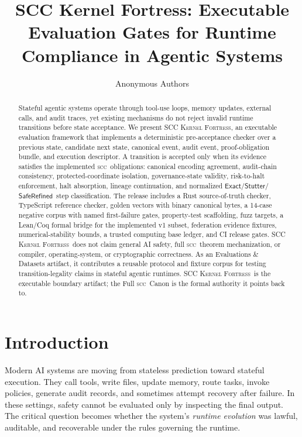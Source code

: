 \documentclass{article}
\title{SCC Kernel Fortress: Executable Evaluation Gates for Runtime Compliance in Agentic Systems}
\author{Anonymous Authors}
\newcommand{\SCC}{\textsc{scc}}
\newcommand{\KF}{\textsc{SCC Kernel Fortress}}
\newcommand{\Exact}{\ensuremath{\mathsf{Exact}}}
\newcommand{\Stutter}{\ensuremath{\mathsf{Stutter}}}
\newcommand{\SafeRefined}{\ensuremath{\mathsf{SafeRefined}}}
\begin{document}
\maketitle

\begin{abstract}
Stateful agentic systems operate through tool-use loops, memory updates, external calls, and audit traces, yet existing mechanisms do not reject invalid runtime transitions before state acceptance. We present \KF, an executable evaluation framework that implements a deterministic pre-acceptance checker over a previous state, candidate next state, canonical event, audit event, proof-obligation bundle, and execution descriptor. A transition is accepted only when its evidence satisfies the implemented \SCC\ obligations: canonical encoding agreement, audit-chain consistency, protected-coordinate isolation, governance-state validity, risk-to-halt enforcement, halt absorption, lineage continuation, and normalized \Exact/\Stutter/\SafeRefined\ step classification. The release includes a Rust source-of-truth checker, TypeScript reference checker, golden vectors with binary canonical bytes, a 14-case negative corpus with named first-failure gates, property-test scaffolding, fuzz targets, a Lean/Coq formal bridge for the implemented v1 subset, federation evidence fixtures, numerical-stability bounds, a trusted computing base ledger, and CI release gates. \KF\ does not claim general AI safety, full \SCC\ theorem mechanization, or compiler, operating-system, or cryptographic correctness. As an Evaluations \& Datasets artifact, it contributes a reusable protocol and fixture corpus for testing transition-legality claims in stateful agentic runtimes. \KF\ is the executable boundary artifact; the Full \SCC\ Canon is the formal authority it points back to.
\end{abstract}

\section{Introduction}
Modern AI systems are moving from stateless prediction toward stateful execution. They call tools, write files, update memory, route tasks, invoke policies, generate audit records, and sometimes attempt recovery after failure. In these settings, safety cannot be evaluated only by inspecting the final output. The critical question becomes whether the system's \emph{runtime evolution} was lawful, auditable, and recoverable under the rules governing the runtime.
\end{document}
